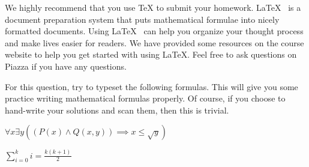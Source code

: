 \Question{\LaTeX}

We highly recommend that you use TeX to submit your homework. \LaTeX ~ is a document preparation system that puts mathematical formulae into nicely formatted documents. Using \LaTeX ~ can help you organize your thought process and make lives easier for readers. We have provided some resources on the course website to help you get started with using \LaTeX. Feel free to ask questions on Piazza if you have any questions.

For this question, try to typeset the following formulas. This will give you some practice writing mathematical formulas properly. Of course, if you choose to hand-write your solutions and scan them, then this is trivial. 

\begin{Parts}

  \Part $\forall x \exists y \left(\left(P(x) \wedge Q(x, y)\right) \implies x \leq \sqrt{y} \right)$
  
  \Part $\displaystyle \sum_{i = 0}^k i = \frac{k(k + 1)}{2}$
  
\end{Parts}


